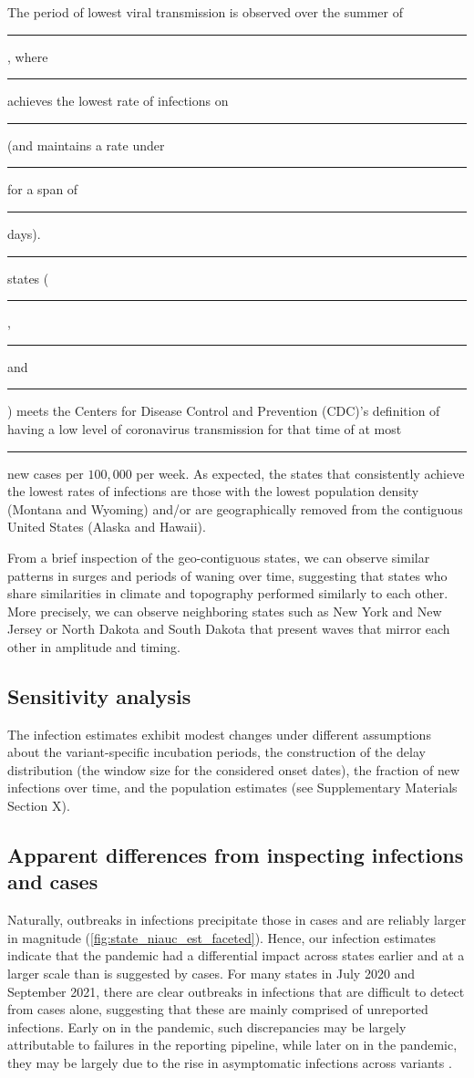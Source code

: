 \documentclass{article}
\begin{document}
The period of lowest viral transmission is observed over the summer of \rule{1cm}{0.15mm}, where \rule{1cm}{0.15mm} achieves the lowest rate of infections on \rule{1cm}{0.15mm} (and maintains a rate under \rule{1cm}{0.15mm} for a span of \rule{1cm}{0.15mm} days). \rule{1cm}{0.15mm} states (\rule{1cm}{0.15mm}, \rule{1cm}{0.15mm} and \rule{1cm}{0.15mm}) meets the Centers for Disease Control and Prevention (CDC)’s definition of having a low level of coronavirus transmission for that time of at most \rule{1cm}{0.15mm} new cases per $100,000$ per week. As expected, the states that consistently achieve the lowest rates of infections are those with the lowest population density (Montana and Wyoming) and/or are geographically removed from the contiguous United States (Alaska and Hawaii). %

From a brief inspection of the geo-contiguous states, we can observe similar patterns in surges and periods of waning over time, suggesting that states who share similarities in climate and topography performed similarly to each other. More precisely, we can observe neighboring states such as New York and New Jersey or North Dakota and South Dakota that present waves that mirror each other in amplitude and timing.

\subsection{Sensitivity analysis}
The infection estimates exhibit modest changes under different assumptions about the variant-specific incubation periods, the construction of the delay distribution (the window size for the considered onset dates), the fraction of new infections over time, and the population estimates (see Supplementary Materials Section X). %

\subsection{Apparent differences from inspecting infections and cases}
Naturally, outbreaks in infections precipitate those in cases and are reliably larger in magnitude (\autoref{fig:state_niauc_est_faceted}). Hence, our infection estimates indicate that the pandemic had a differential impact across states earlier and at a larger scale than is suggested by cases. For many states in July 2020 and September 2021, there are clear outbreaks in infections that are difficult to detect from cases alone, suggesting that these are mainly comprised of unreported infections. Early on in the pandemic, such discrepancies may be largely attributable to failures in the reporting pipeline, while later on in the pandemic, they may be largely due to the rise in asymptomatic infections across variants \citep{oph2022covid, garrett2022high}. %
\end{document}
